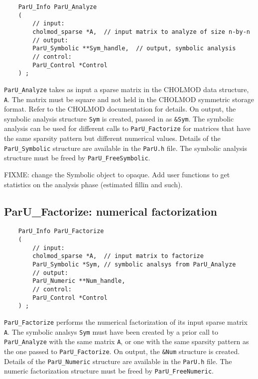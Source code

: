 \documentclass[12pt]{article}
\begin{document}
    {\footnotesize
    \begin{verbatim}
    ParU_Info ParU_Analyze
    (
        // input:
        cholmod_sparse *A,  // input matrix to analyze of size n-by-n
        // output:
        ParU_Symbolic **Sym_handle,  // output, symbolic analysis
        // control:
        ParU_Control *Control
    ) ; \end{verbatim}}

    \verb'ParU_Analyze' takes as input a sparse matrix in the CHOLMOD data
    structure, \verb'A'.  The matrix must be square and not held in the CHOLMOD
    symmetric storage format.  Refer to the CHOLMOD documentation for details.
    On output, the symbolic analysis structure \verb'Sym' is created, passed in
    as \verb'&Sym'.  The symbolic analysis can be used for different calls to
    \verb'ParU_Factorize' for matrices that have the same sparsity pattern but
    different numerical values.  Details of the \verb'ParU_Symbolic' structure
    are available in the \verb'ParU.h' file.  The symbolic analysis structure
    must be freed by \verb'ParU_FreeSymbolic'.

    FIXME: change the Symbolic object to opaque.  Add user functions to
    get statistics on the analysis phase (estimated fillin and such).

\subsection{{\sf ParU\_Factorize}: numerical factorization}

    {\footnotesize
    \begin{verbatim}
    ParU_Info ParU_Factorize
    (
        // input:
        cholmod_sparse *A,  // input matrix to factorize
        ParU_Symbolic *Sym, // symbolic analsys from ParU_Analyze
        // output:
        ParU_Numeric **Num_handle,
        // control:
        ParU_Control *Control
    ) ; \end{verbatim}}

    \verb'ParU_Factorize' performs the numerical factorization of its input
    sparse matrix \verb'A'.  The symbolic analsys \verb'Sym' must have been
    created by a prior call to \verb'ParU_Analyze' with the same matrix
    \verb'A', or one with the same sparsity pattern as the one passed to
    \verb'ParU_Factorize'.  On output, the \verb'&Num' structure is created.
    Details of the \verb'ParU_Numeric' structure are available in the
    \verb'ParU.h' file.  The numeric factorization structure must be freed by
    \verb'ParU_FreeNumeric'.
\end{document}
